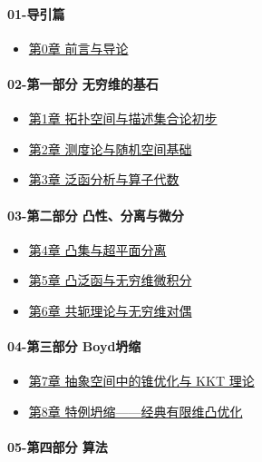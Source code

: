         \paragraph{01-导引篇}

\begin{itemize}
  \item \hyperref[chap:00]{第0章 前言与导论}
\end{itemize}

\paragraph{02-第一部分 无穷维的基石}

\begin{itemize}
  \item \hyperref[chap:01]{第1章 拓扑空间与描述集合论初步}
  \item \hyperref[chap:02]{第2章 测度论与随机空间基础}
  \item \hyperref[chap:03]{第3章 泛函分析与算子代数}
\end{itemize}

\paragraph{03-第二部分 凸性、分离与微分}

\begin{itemize}
  \item \hyperref[chap:04]{第4章 凸集与超平面分离}
  \item \hyperref[chap:05]{第5章 凸泛函与无穷维微积分}
  \item \hyperref[chap:06]{第6章 共轭理论与无穷维对偶}
\end{itemize}

\paragraph{04-第三部分 Boyd坍缩}

\begin{itemize}
  \item \hyperref[chap:07]{第7章 抽象空间中的锥优化与 KKT 理论}
  \item \hyperref[chap:08]{第8章 特例坍缩——经典有限维凸优化}
\end{itemize}

\paragraph{05-第四部分 算法}

